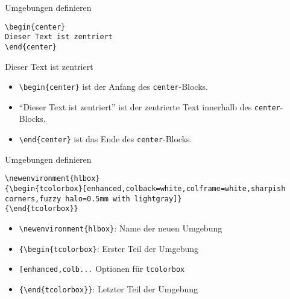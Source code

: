 \documentclass[10pt,a4paper, ngerman]{beamer}
\begin{document}
\begin{frame}[fragile]{Umgebungen definieren}
\begin{lstlisting}[caption = zentrierter Text]
\begin{center}
Dieser Text ist zentriert
\end{center}
\end{lstlisting}
\pause
\begin{hlbox}
\begin{center}
Dieser Text ist zentriert
\end{center}
\end{hlbox}
\pause
\begin{itemize}
\item \lstinline|\begin{center}| ist der Anfang des \texttt{center}-Blocks.  \pause
\item \enquote{Dieser Text ist zentriert} ist der zentrierte Text innerhalb des \texttt{center}-Blocks. \pause
\item \lstinline|\end{center}| ist das Ende des \texttt{center}-Blocks. 
\end{itemize}
\end{frame}

\begin{frame}[fragile]{Umgebungen definieren}
\begin{lstlisting}[caption = Highlightbox]
\newenvironment{hlbox}
{\begin{tcolorbox}[enhanced,colback=white,colframe=white,sharpish corners,fuzzy halo=0.5mm with lightgray]}
{\end{tcolorbox}}
\end{lstlisting} \pause
\begin{itemize}
\item \lstinline|\newenvironment{hlbox}|: Name der neuen Umgebung \pause
\item \lstinline|{\begin{tcolorbox}|: Erster Teil der Umgebung \pause
\item \lstinline|[enhanced,colb...| Optionen für \texttt{tcolorbox} \pause
\item \lstinline|{\end{tcolorbox}}|: Letzter Teil der Umgebung
\end{itemize}
\end{frame}
\renewenvironment{bmatrix}
{ \begin{center} \begin{em} }
{ \end{em} \end{center} }
\end{document}
